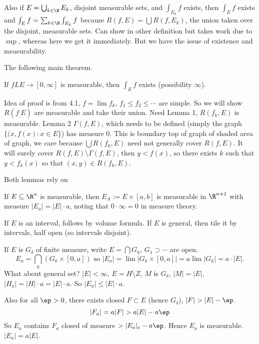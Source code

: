 Also  if $E= \bigcup_{k \in \N} E_k$, disjoint measurable sets, and $\int_{E_k} f$ exists, then $\int_E f$ exists and $\int_E f= \sum_{k \in \N} \int_{E_k} f$ because $R(f,E)= \bigcup R(f,E_k)$, the union taken over the disjoint, measurable sets. Can show in other definition but takes work due to $\sup$, whereas here we get it immediately. But we have the issue of existence and measurability. 

The following main theorem. 


\begin{thm}
If $fL E \to [0,\infty]$ is measurable, then $\int_E f$ exists (possibility $\infty$). 
\end{thm}



Idea of proof is from 4.1, $f= \lim f_k$, $f_1 \leq f_2 \leq \cdots$ are simple. So we will show $R(f_,E)$ are measurable and take their union. Need Lemma 1, $R(f_k,E)$ is measurable. Lemma 2 $\Gamma(f,E)$, which needs to be defined (simply the graph $\{(x,f(x) \colon x \in E\}$) has measure 0. This is boundary top of graph of shaded area of graph, we care because $\bigcup R(f_k,E)$ need not generally cover $R(f,E)$. It will surely cover $R(f,E) \setminus \Gamma(f,E)$, then $y<f(x)$, so there exists $k$ such that $y<f_k(x)$ so that $(x,y) \in R(f_k,E)$. 




Both lemmas rely on 

\begin{lem}
If $E \subseteq \R^n$ is measurable, then $E_A:= E \times [a,b]$ is measurable in $\R^{n+1}$ with measure $|E_a|= |E| \cdot a$, noting that $0 \cdot \infty=0$ in measure theory. 
\end{lem}

\pf If $E$ is an interval, follows by volume formula. If $E$ is general, then tile it by intervals, half open (so intervals disjoint). 

If $E$ is $G_\delta$ of finite measure, write $E= \bigcap G_k$, $G_1 \supset \cdots$ are open. 
	\[
	E_a = \bigcap_k (G_k \times [0,a]) \text{ so } |E_a|= \lim |G_k \times [0,a]|= a \lim |G_k| = a \cdot |E|.
	\]
What about general set? $|E|<\infty$, $E= H \setminus Z$, $M$ is $G_\delta$, $|M|=|E|$, $|H_a|=|H| \cdot a = |E| \cdot a$. So $|E_a| \leq |E| \cdot a$. 


Also for all $\ep>0$, there exists closed $F \subset E$ (hence $G_\delta$), $|F|>|E|-\ep$. 
	\[
	|F_a|= a |F|> a|E|- a\ep
	\]
So $E_a$ contains $F_a$ closed of measure $>|E_a|_e - a\ep$. Hence $E_a$ is measurable. $|E_a|= a|E|$. 

